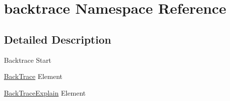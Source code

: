 \hypertarget{namespacebacktrace}{
\section{backtrace Namespace Reference}
\label{namespacebacktrace}
}


\subsection{Detailed Description}
Backtrace Start

\hyperlink{class_back_trace}{BackTrace} Element

\hyperlink{class_back_trace_explain}{BackTraceExplain} Element 


